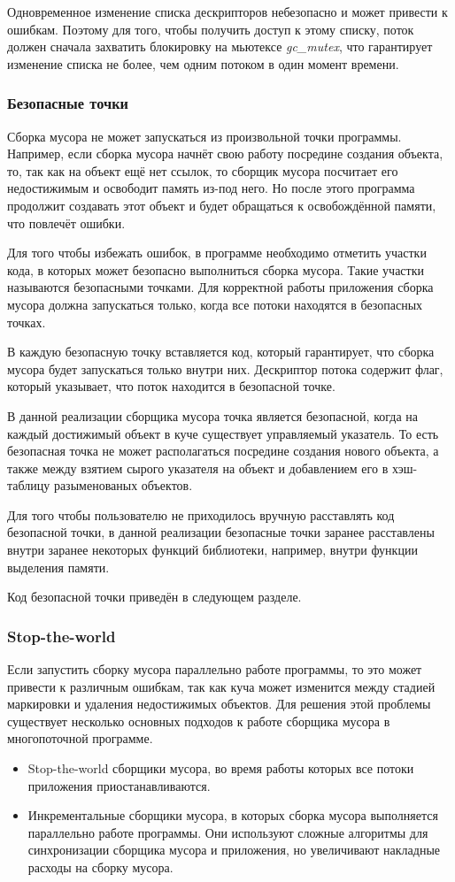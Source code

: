 Одновременное изменение списка дескрипторов небезопасно и может привести к ошибкам.
Поэтому для того, чтобы получить доступ к этому списку, поток должен сначала захватить блокировку на мьютексе \textit{gc\_mutex}, что гарантирует изменение списка не более, чем одним потоком в один момент времени.

\subsubsection{Безопасные точки}
Сборка мусора не может запускаться из произвольной точки программы. Например, если сборка мусора начнёт свою работу посредине создания объекта, то, так как на объект ещё нет ссылок, то сборщик мусора
посчитает его недостижимым и освободит память из-под него. Но после этого программа продолжит создавать этот объект и будет обращаться к освобождённой памяти, что повлечёт ошибки.

Для того чтобы избежать ошибок, в программе необходимо отметить участки кода, в которых может безопасно выполниться сборка мусора. Такие участки называются  безопасными точками. Для корректной работы приложения сборка мусора должна запускаться только, когда все потоки находятся в безопасных точках.

В каждую безопасную точку вставляется код, который гарантирует, что сборка мусора будет запускаться только внутри них. Дескриптор потока содержит флаг, который указывает, что поток находится в безопасной точке.

В данной реализации сборщика мусора точка является безопасной, когда на каждый достижимый объект в куче существует управляемый указатель. То есть безопасная точка не может располагаться посредине создания нового объекта, а также между взятием сырого указателя на объект и добавлением его в хэш-таблицу разыменованых объектов.

Для того чтобы пользователю не приходилось вручную расставлять код безопасной точки, в данной реализации безопасные точки заранее расставлены внутри заранее некоторых функций библиотеки, например, внутри функции выделения памяти.


Код безопасной точки приведён в следующем разделе.

\subsubsection{Stop-the-world} \label{ch:stop-the-world}
Если запустить сборку мусора параллельно работе программы, то это может привести к различным ошибкам, так как куча может изменится между стадией маркировки и удаления недостижимых объектов. Для решения этой проблемы существует несколько основных подходов к работе сборщика мусора в многопоточной программе.
\begin{itemize}
\item Stop-the-world сборщики мусора, во время работы которых все потоки приложения приостанавливаются. 
\item Инкрементальные сборщики мусора, в которых сборка мусора выполняется параллельно работе программы. Они используют сложные алгоритмы для синхронизации сборщика мусора и приложения, но увеличивают накладные расходы на сборку мусора.
\end{itemize}

